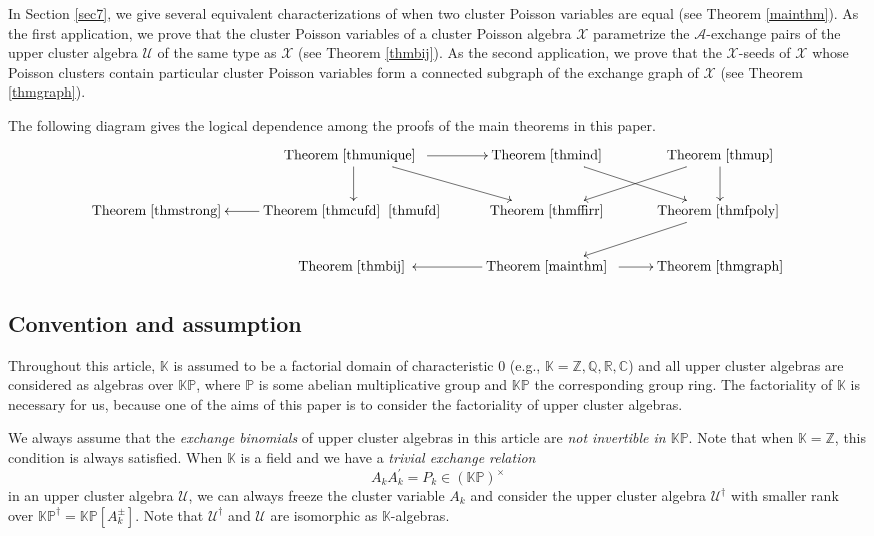 \documentclass{amsart}
\theoremstyle{definition}
\theoremstyle{remark}
\numberwithin{equation}{section}
\begin{document}
In Section \ref{sec7}, we give several equivalent characterizations of when two cluster Poisson variables are equal (see Theorem \ref{mainthm}).  As the first application, we prove that the cluster Poisson variables of a cluster Poisson algebra $\mathcal X$ parametrize the $\mathscr A$-exchange pairs of the upper cluster algebra $\mathcal U$ of the same type as $\mathcal X$ (see Theorem \ref{thmbij}).  As the second application, we prove that the $\mathscr X$-seeds of  $\mathcal X$ whose Poisson clusters contain particular cluster Poisson variables form a connected subgraph of the exchange graph of  $\mathcal X$ (see Theorem \ref{thmgraph}).


 The following diagram gives  the logical dependence among the proofs of the main theorems in this paper.
$$
\begin{array}{ccc}
\xymatrix{&{\rm Theorem}\; \ref{thmunique}\;\ar[r]\ar[d]\ar[rd]\;&{\rm Theorem}\; \ref{thmind}\;\ar[rd]\;&{\rm Theorem}\;\ref{thmup}\ar[d]\ar[ld]\\
{\rm Theorem}\;\ref{thmstrong}&{\rm Theorem}\;\ref{thmcufd}\;\;\ref{thmufd}\ar[l]   \;&{\rm Theorem}\;\ref{thmffirr}\;  \;&{\rm Theorem}\; \ref{thmfpoly}\;\ar[ld]\\
&{\rm Theorem}\;\ref{thmbij}   \;&{\rm Theorem}\;\ref{mainthm}\ar[l]\ar[r]\;  \;&{\rm Theorem}\; \ref{thmgraph}}
\end{array}
$$
\subsection{Convention and assumption} \label{rmkexbi}
  Throughout this article,   $\mathbb K$ is assumed to be a factorial domain of characteristic $0$ (e.g., $\mathbb K=\mathbb Z, \mathbb Q, \mathbb R, \mathbb C$)
and all upper cluster algebras are considered as algebras over $\mathbb {KP}$, where $\mathbb P$ is some abelian multiplicative group and $\mathbb{KP}$ the corresponding group ring. The factoriality of $\mathbb K$ is necessary for us, because one of the aims of this paper is to consider the factoriality of upper cluster algebras.


 We always assume that the {\em exchange binomials} of upper cluster algebras in this article are {\em not invertible in $\mathbb {KP}$}. Note that when $\mathbb K=\mathbb Z$, this condition is always satisfied. When $\mathbb K$ is a field and we have a {\em trivial exchange relation} $$A_{k}A_k^\prime=P_k\in(\mathbb{KP})^\times$$ in an upper cluster algebra $\mathcal U$,  we can always freeze the cluster variable $A_k$ and consider the upper cluster algebra $\mathcal U^\dag$ with smaller rank over $\mathbb {KP}^\dag=\mathbb {KP}[A_k^\pm]$. Note that $\mathcal U^\dag$ and $\mathcal U$ are isomorphic as $\mathbb K$-algebras.
\end{document}
